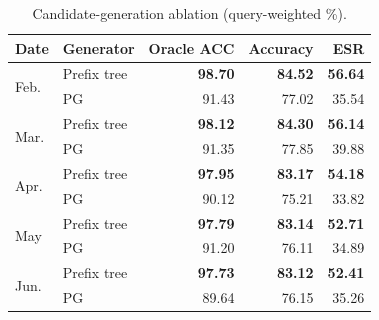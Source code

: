 \begin{table}[t]
\centering
\caption{Candidate-generation ablation (query-weighted \%).}
\label{tab:ablation_generator}
\footnotesize
\setlength{\tabcolsep}{3pt}
\renewcommand{\arraystretch}{1.08}
\begin{tabular*}{\columnwidth}{@{\extracolsep{\fill}}llrrr@{}}
\toprule
Date & Generator & Oracle ACC & Accuracy & ESR\\
\midrule
\multirow{2}{*}{Feb.} & Prefix tree & \textbf{98.70} & \textbf{84.52} & \textbf{56.64}\\
 & PG & 91.43 & 77.02 & 35.54\\
\midrule
\multirow{2}{*}{Mar.} & Prefix tree & \textbf{98.12} & \textbf{84.30} & \textbf{56.14}\\
 & PG & 91.35 & 77.85 & 39.88\\
\midrule
\multirow{2}{*}{Apr.} & Prefix tree & \textbf{97.95} & \textbf{83.17} & \textbf{54.18}\\
 & PG & 90.12 & 75.21 & 33.82\\
\midrule
\multirow{2}{*}{May} & Prefix tree & \textbf{97.79} & \textbf{83.14} & \textbf{52.71}\\
 & PG & 91.20 & 76.11 & 34.89\\
\midrule
\multirow{2}{*}{Jun.} & Prefix tree & \textbf{97.73} & \textbf{83.12} & \textbf{52.41}\\
 & PG & 89.64 & 76.15 & 35.26\\
\bottomrule
\end{tabular*}
\end{table}
